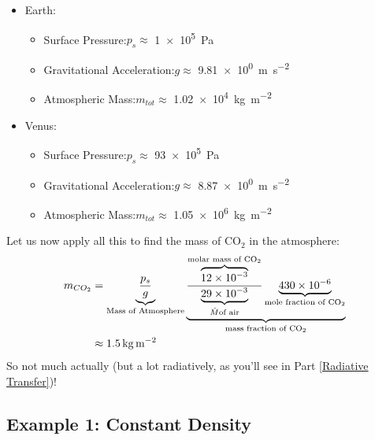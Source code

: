 \begin{multicols}{2}
\begin{itemize}
    \item Earth: 
    \begin{itemize}
        \item Surface Pressure:\newline $p_s\approx$ \qty{1e5}{\pascal}
        \item Gravitational Acceleration:\newline $g\approx$ \qty{9.81e0}{\metre\per\second\squared}
        \item Atmospheric Mass:\newline $m_{tot}\approx$ \qty{1.02e4}{\kilogram\per\metre\squared}
    \end{itemize}
    \item Venus: 
    \begin{itemize}
        \item Surface Pressure:\newline $p_s\approx$ \qty{93e5}{\pascal}
        \item Gravitational Acceleration:\newline $g\approx$ \qty{8.87e0}{\metre\per\second\squared}
        \item Atmospheric Mass:\newline $m_{tot}\approx$ \qty{1.05e6}{\kilogram\per\metre\squared}
    \end{itemize}
\end{itemize}
\end{multicols}
\noindent Let us now apply all this to find the mass of CO$_2$ in the atmosphere:
\begin{align*}
    m_{CO_2}&= \underbrace{\frac{p_s}{g}}_\text{Mass of Atmosphere} \underbrace{\frac{\overbrace{12\times10^{-3}}^{\text{molar mass of CO}_2}}{\underbrace{29\times10^{-3}}_{\hat{M} \text{of air}}} \underbrace{430 \times 10^{-6}}_{\text{mole fraction of CO}_2}}_{\text{mass fraction of CO}_2}\\
    &\approx\text{\qty{1.5}{\kilogram\per\meter\squared}}
\end{align*}
So not much actually (but a lot radiatively, as you'll see in Part \ref{Radiative Transfer})!
\subsection{Example 1: Constant Density}

